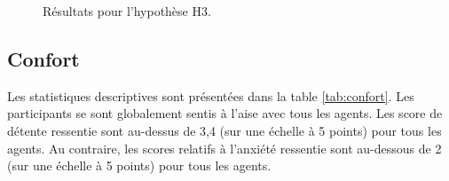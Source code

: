 	\begin{figure}[!tbh]
		
		
		
		\caption{Résultats pour l'hypothèse H3.}
		\label{fig:tour}
	\end{figure}
	
	
	\subsection{Confort}
	
	Les statistiques descriptives sont présentées dans la table \ref{tab:confort}. Les participants se sont globalement sentis à l'aise avec tous les agents.
	Les score de détente ressentie sont au-dessus de 3,4 (sur une échelle à 5 points) pour tous les agents. Au contraire, les scores relatifs à l'anxiété  ressentie sont au-dessous de 2 (sur une échelle à 5 points) pour tous les agents. 
	
